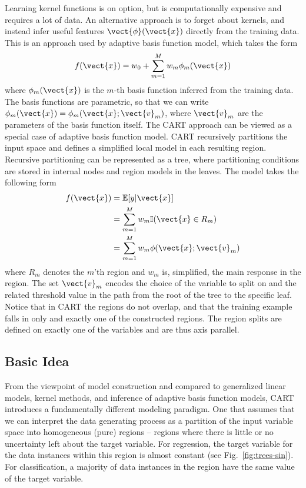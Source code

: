 \begin{refsection}
Learning kernel functions is on option, but is computationally expensive and requires a lot of data. An alternative approach is to forget about kernels, and instead infer useful features $\vect{\phi}(\vect{x})$ directly from the training data. This is an approach used by adaptive basis function model, which takes the form
$$ f(\vect{x})=w_0+\sum_{m=1}^{M} w_m\phi_m(\vect{x}) $$
where $\phi_m(\vect{x})$ is the $m$-th basis function inferred from the training data. The basis functions are parametric, so that we can write $\phi_m(\vect{x})=\phi_m(\vect{x};\vect{v}_m)$, where $\vect{v}_m$ are the parameters of the basis function itself. The CART approach can be viewed as a special case of adaptive basis function model. CART recursively partitions the input space and defines a simplified local model in each resulting region. Recursive partitioning can be represented as a tree, where partitioning conditions are stored in internal nodes and region models in the leaves. The model takes the following form
\begin{align}
f(\vect{x}) & = \mathbb{E}[y|\vect{x}] \\
 & = \sum_{m=1}^M w_m \mathbb{I}(\vect{x}\in R_m) \\
 & = \sum_{m=1}^M w_m\phi(\vect{x};\vect{v}_m)
\end{align}
where $R_m$ denotes the $m$'th region and $w_m$ is, simplified, the main response in the region. The set $\vect{v}_m$ encodes the choice of the variable to split on and the related threshold value in the path from the root of the tree to the specific leaf. Notice that in CART the regions do not overlap, and that the training example falls in only and exactly one of the constructed regions. The region splits are defined on exactly one of the variables and are thus axis parallel.

\subsection*{Basic Idea}

From the viewpoint of model construction and compared to generalized linear models, kernel methods, and inference of adaptive basis function models, CART introduces a fundamentally different modeling paradigm. One that assumes that we can interpret the data generating process as a partition of the input variable space into homogeneous (pure) regions -- regions where there is little or no uncertainty left about the target variable. For regression, the target variable for the data instances within this region is almost constant (see Fig.~\ref{fig:trees-sin}). For classification, a majority of data instances in the region have the same value of the target variable.


\end{refsection}
